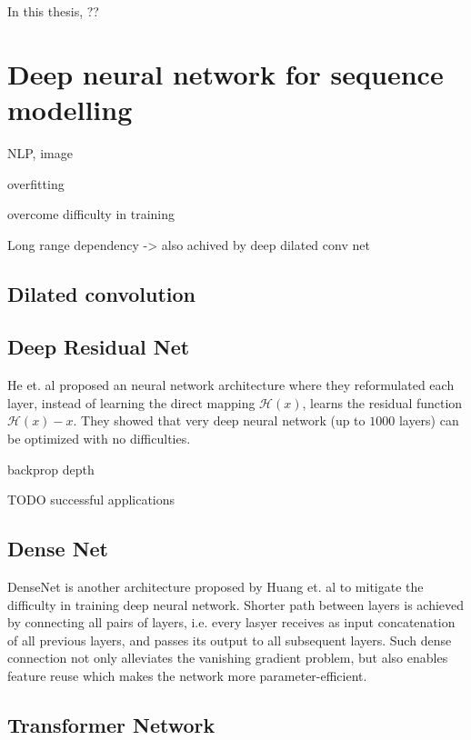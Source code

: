 \documentclass{proposal}
\begin{document}
In this thesis, ??


\section{Deep neural network for sequence modelling}

NLP, image

overfitting

overcome difficulty in training

Long range dependency -> also achived by deep  dilated conv net

\subsection*{Dilated convolution}

\subsection*{Deep Residual Net}

He et. al\cite{he2016deep} proposed an neural network architecture where they reformulated
each layer, instead of learning the direct mapping $\mathcal{H}(x)$,
learns the residual function $\mathcal{H}(x) - x$.
They showed that very deep neural network (up to $1000$ layers) can be optimized with no difficulties.

backprop depth

TODO successful applications

\subsection*{Dense Net}

DenseNet is another architecture proposed by Huang et. al\cite{huang2017densely}
to mitigate the difficulty in training deep neural network.
Shorter path between layers is achieved by connecting all pairs of layers,
i.e. every lasyer receives as input concatenation of all previous layers, and passes its output to all subsequent layers.
Such dense connection not only alleviates the vanishing gradient problem, but also enables feature reuse which makes the network more parameter-efficient.


\subsection*{Transformer Network}
\end{document}
